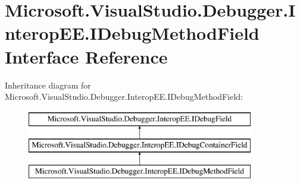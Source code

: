 \hypertarget{interface_microsoft_1_1_visual_studio_1_1_debugger_1_1_interop_e_e_1_1_i_debug_method_field}{\section{Microsoft.\+Visual\+Studio.\+Debugger.\+Interop\+E\+E.\+I\+Debug\+Method\+Field Interface Reference}
\label{interface_microsoft_1_1_visual_studio_1_1_debugger_1_1_interop_e_e_1_1_i_debug_method_field}
}
Inheritance diagram for Microsoft.\+Visual\+Studio.\+Debugger.\+Interop\+E\+E.\+I\+Debug\+Method\+Field\+:\begin{figure}[H]
\begin{center}
\leavevmode
\includegraphics[height=3.000000cm]{interface_microsoft_1_1_visual_studio_1_1_debugger_1_1_interop_e_e_1_1_i_debug_method_field}
\end{center}
\end{figure}
